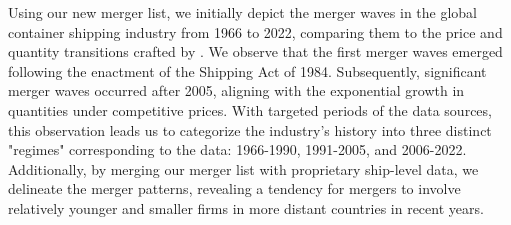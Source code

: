 \documentclass[10pt]{article}
\begin{document}
Using our new merger list, we initially depict the merger waves in the global container shipping industry from 1966 to 2022, comparing them to the price and quantity transitions crafted by \cite{matsuda2022unified}.
We observe that the first merger waves emerged following the enactment of the Shipping Act of 1984. 
Subsequently, significant merger waves occurred after 2005, aligning with the exponential growth in quantities under competitive prices. With targeted periods of the data sources, this observation leads us to categorize the industry's history into three distinct "regimes" corresponding to the data: 1966-1990, 1991-2005, and 2006-2022.
Additionally, by merging our merger list with proprietary ship-level data, we delineate the merger patterns, revealing a tendency for mergers to involve relatively younger and smaller firms in more distant countries in recent years.
\end{document}
